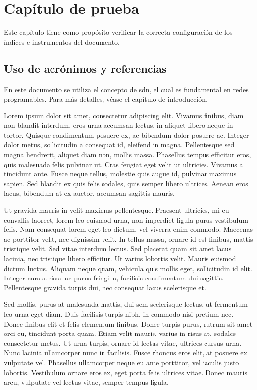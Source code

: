 \chapter{Capítulo de prueba}
\label{chap:test}

Este capítulo tiene como propósito verificar la correcta configuración de los índices e instrumentos del documento.

\section{Uso de acrónimos y referencias}
En este documento se utiliza el concepto de \gls{sdn}, el cual es fundamental en redes programables. Para más detalles, véase el capítulo de introducción. 

Lorem ipsum dolor sit amet, consectetur adipiscing elit. Vivamus finibus, diam non blandit interdum, eros urna accumsan lectus, in aliquet libero neque in tortor. Quisque condimentum posuere ex, ac bibendum dolor posuere ac. Integer dolor metus, sollicitudin a consequat id, eleifend in magna. Pellentesque sed magna hendrerit, aliquet diam non, mollis massa. Phasellus tempus efficitur eros, quis malesuada felis pulvinar ut. Cras feugiat eget velit ut ultricies. Vivamus a tincidunt ante. Fusce neque tellus, molestie quis augue id, pulvinar maximus sapien. Sed blandit ex quis felis sodales, quis semper libero ultrices. Aenean eros lacus, bibendum at ex auctor, accumsan sagittis mauris.

Ut gravida mauris in velit maximus pellentesque. Praesent ultricies, mi eu convallis laoreet, lorem leo euismod urna, non imperdiet ligula purus vestibulum felis. Nam consequat lorem eget leo dictum, vel viverra enim commodo. Maecenas ac porttitor velit, nec dignissim velit. In tellus massa, ornare id est finibus, mattis tristique velit. Sed vitae interdum lectus. Sed placerat quam sit amet lacus lacinia, nec tristique libero efficitur. Ut varius lobortis velit. Mauris euismod dictum luctus. Aliquam neque quam, vehicula quis mollis eget, sollicitudin id elit. Integer cursus risus ac purus fringilla, facilisis condimentum dui sagittis. Pellentesque gravida turpis dui, nec consequat lacus scelerisque et.

Sed mollis, purus at malesuada mattis, dui sem scelerisque lectus, ut fermentum leo urna eget diam. Duis facilisis turpis nibh, in commodo nisi pretium nec. Donec finibus elit et felis elementum finibus. Donec turpis purus, rutrum sit amet orci eu, tincidunt porta quam. Etiam velit mauris, varius in risus at, sodales consectetur metus. Ut urna turpis, ornare id lectus vitae, ultrices cursus urna. Nunc lacinia ullamcorper nunc in facilisis. Fusce rhoncus eros elit, at posuere ex vulputate vel. Phasellus ullamcorper neque eu ante porttitor, vel iaculis justo lobortis. Vestibulum ornare eros ex, eget porta felis ultrices vitae. Donec mauris arcu, vulputate vel lectus vitae, semper tempus ligula.

